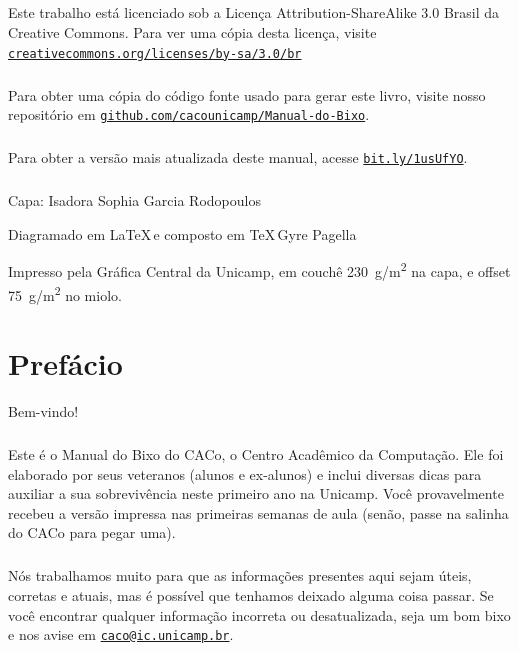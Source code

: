 \documentclass[a4paper,10pt,oldfontcommands]{memoir}
\newcommand{\email}[1]{\href{mailto:#1}{\nolinkurl{#1}}}
\renewcommand{\url}[1]{\href{http://#1}{\nolinkurl{#1}}}
\begin{document}
\begin{center}
\paragraph{}
Este trabalho está licenciado sob a Licença Attribution-ShareAlike 3.0 Brasil da
Creative Commons. Para ver uma cópia desta licença, visite
\url{creativecommons.org/licenses/by-sa/3.0/br}

\paragraph{}
Para obter uma cópia do código fonte usado para gerar este livro, visite nosso
repositório em \url{github.com/cacounicamp/Manual-do-Bixo}.

\paragraph{}
Para obter a versão mais atualizada deste manual, acesse \url{bit.ly/1usUfYO}.


\paragraph{}
Capa: Isadora Sophia Garcia Rodopoulos

\vfill

Diagramado em \LaTeX\,e composto em \TeX\,Gyre Pagella

Impresso pela Gráfica Central da Unicamp, em couchê \SI{230}{g/m^2} na capa, e offset
\SI{75}{g/m^2} no miolo.

\end{center}
\cleardoublepage
\pagestyle{plain}
\tableofcontents

\chapter{Prefácio}

Bem-vindo!

\paragraph{}
Este é o Manual do Bixo do CACo, o Centro Acadêmico da Computação. Ele foi
elaborado por seus veteranos (alunos e ex-alunos) e inclui diversas dicas para
auxiliar a sua sobrevivência neste primeiro ano na Unicamp. Você provavelmente
recebeu a versão impressa nas primeiras semanas de aula (senão, passe na salinha
do CACo para pegar uma).

\paragraph{}
Nós trabalhamos muito para que as informações presentes aqui sejam úteis,
corretas e atuais, mas é possível que tenhamos deixado alguma coisa passar. Se
você encontrar qualquer informação incorreta ou desatualizada, seja um bom bixo
e nos avise em \email{caco@ic.unicamp.br}.
\end{document}
